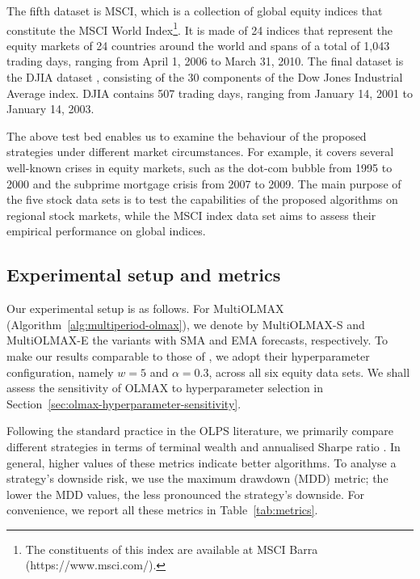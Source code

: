 The fifth dataset is MSCI, which is a collection of global equity indices that constitute the MSCI World Index\footnote{The constituents of this index are available at MSCI Barra (https://www.msci.com/).}. It is made of 24 indices that represent the equity markets of 24 countries around the world and spans of a total of 1,043 trading days, ranging from April 1, 2006 to March 31, 2010. The final dataset is the DJIA dataset \citep{borodin04}, consisting of the 30 components of the Dow Jones Industrial Average index. DJIA contains 507 trading days, ranging from January 14, 2001 to January 14, 2003.

The above test bed enables us to examine the behaviour of the proposed strategies under different market circumstances. For example, it covers several well-known crises in equity markets, such as the dot-com bubble from 1995 to 2000 and the subprime mortgage crisis from 2007 to 2009. The main purpose of the five stock data sets is to test the capabilities of the proposed algorithms on regional stock markets, while the MSCI index data set aims to assess their empirical performance on global indices.

\subsection{Experimental setup and metrics}

Our experimental setup is as follows. For MultiOLMAX (Algorithm~\ref{alg:multiperiod-olmax}), we denote by MultiOLMAX-S and MultiOLMAX-E the variants with SMA and EMA forecasts, respectively. To make our results comparable to those of \citet{olmar}, we adopt their hyperparameter configuration, namely $w = 5$ and $\alpha = 0.3$, across all six equity data sets. We shall assess the sensitivity of OLMAX to hyperparameter selection in Section~\ref{sec:olmax-hyperparameter-sensitivity}.

Following the standard practice in the OLPS literature, we primarily compare different strategies in terms of terminal wealth and annualised Sharpe ratio \citep{sharpe}. In general, higher values of these metrics indicate better algorithms. To analyse a strategy's downside risk, we use the maximum drawdown (MDD) metric; the lower the MDD values, the less pronounced the strategy's downside. For convenience, we report all these metrics in Table~\ref{tab:metrics}.
\begin{table}[t]
  \caption{Summary of the performance metrics used in the evaluations.}
  \label{tab:metrics}
  \centering
\end{table}

